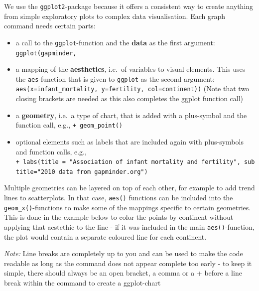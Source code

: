 \documentclass[
]{book}
\providecommand{\tightlist}{%
  \setlength{\itemsep}{0pt}\setlength{\parskip}{0pt}}
\begin{document}
We use the \texttt{ggplot2}-package because it offers a consistent way to create anything from simple exploratory plots to complex data visualisation. Each graph command needs certain parts:

\begin{itemize}
\tightlist
\item
  a call to the \texttt{ggplot}-function and the \textbf{data} as the first argument: \texttt{ggplot(gapminder,}
\item
  a mapping of the \textbf{aesthetics}, i.e.~of variables to visual elements. This uses the \texttt{aes}-function that is given to \texttt{ggplot} as the second argument: \texttt{aes(x=infant\_mortality,\ y=fertility,\ col=continent))} (Note that two closing brackets are needed as this also completes the ggplot function call)
\item
  a \textbf{geometry}, i.e.~a type of chart, that is added with a plus-symbol and the function call, e.g., \texttt{+\ geom\_point()}
\item
  optional elements such as labels that are included again with plus-symbols and function calls, e.g., \texttt{+\ labs(title\ =\ "Association\ of\ infant\ mortality\ and\ fertility",\ subtitle="2010\ data\ from\ gapminder.org")}
\end{itemize}

Multiple geometries can be layered on top of each other, for example to add trend lines to scatterplots. In that case, \texttt{aes()} functions can be included into the \texttt{geom\_x()}-functions to make some of the mappings specific to certain geometries. This is done in the example below to color the points by continent without applying that aestethic to the line - if it was included in the main \texttt{aes()}-function, the plot would contain a separate coloured line for each continent.

\emph{Note:} Line breaks are completely up to you and can be used to make the code readable as long as the command does not appear complete too early - to keep it simple, there should always be an open bracket, a comma or a + before a line break within the command to create a ggplot-chart
\end{document}
